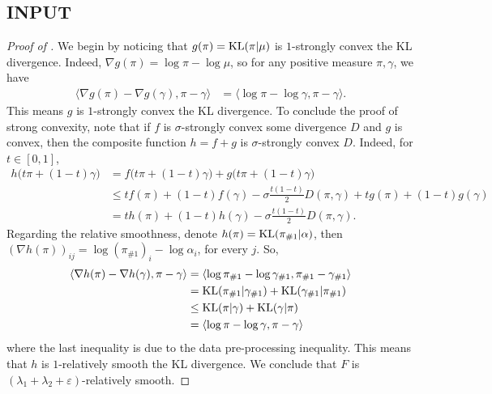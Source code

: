 \subsection{INPUT}
\begin{proof}[Proof of ]
We begin by noticing that $g(\pi) = \text{KL}(\pi | \mu)$ is $1$-strongly convex \wrt the KL divergence.
Indeed, $\nabla g(\pi) = \log \pi - \log \mu$, so for any positive measure $\pi, \gamma$, we have
\begin{align}
    \langle \nabla g(\pi) - \nabla g(\gamma), \pi - \gamma \rangle
    &= \langle
    \log \pi - \log \gamma, \pi - \gamma \rangle.
\end{align}
This means $g$ is $1$-strongly convex \wrt the KL divergence.
To conclude the proof of strong convexity, note that if $f$ is $\sigma$-strongly convex \wrt
some divergence $D$ and $g$ is convex, then the composite function $h = f + g$ is
$\sigma$-strongly convex \wrt $D$. Indeed, for $t \in [0,1]$,
\begin{align}
    h \big( t \pi + (1-t) \gamma \big)
    &= f \big( t \pi + (1-t) \gamma \big) + g \big( t \pi + (1-t) \gamma \big) \\
    &\leq t f(\pi) + (1 - t) f(\gamma) - \sigma \frac{t (1 - t)}{2} D(\pi, \gamma)
    + t g(\pi) + (1 - t) g(\gamma) \\
    &= t h(\pi) + (1 - t) h(\gamma) - \sigma \frac{t (1 - t)}{2} D(\pi, \gamma).
\end{align}
Regarding the relative smoothness, denote $h(\pi) = \text{KL}(\pi_{\#1} | \alpha)$,
then $(\nabla h(\pi))_{ij} = \log (\pi_{\#1})_i - \log \alpha_i$, for every $j$. So,
\begin{equation}
    \begin{split}
        \langle \nabla h(\pi) - \nabla h(\gamma), \pi - \gamma \rangle
    &= \langle
    \log \pi_{\# 1} - \log \gamma_{\# 1}, \pi_{\# 1} - \gamma_{\# 1} \rangle\\
    &= \text{KL}(\pi_{\# 1} | \gamma_{\# 1}) + \text{KL}(\gamma_{\# 1} | \pi_{\# 1}) \\
    &\leq \text{KL}(\pi | \gamma) + \text{KL}(\gamma | \pi) \\
    &= \langle \log \pi - \log \gamma, \pi - \gamma \rangle
    \end{split}
\end{equation}
where the last inequality is due to the data pre-processing inequality.
This means that $h$ is $1$-relatively smooth \wrt the KL divergence.
We conclude that $F$ is $(\lambda_1 + \lambda_2 + \varepsilon)$-relatively smooth.
\end{proof}

